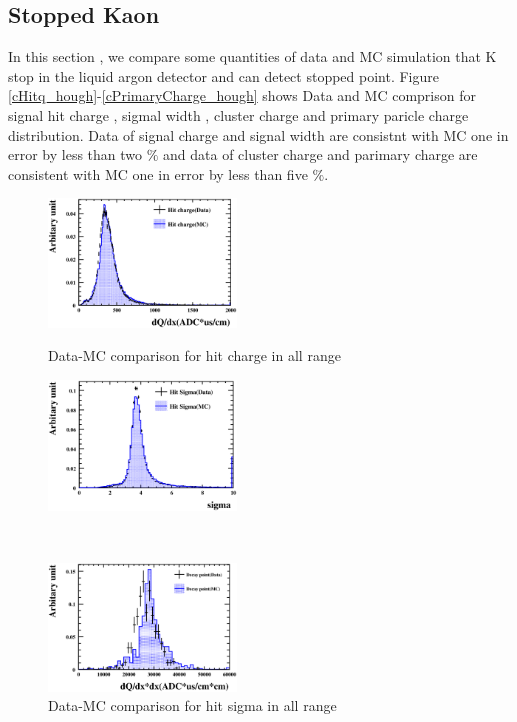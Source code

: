 \subsection{Stopped Kaon}
In this section , we compare some quantities of data and MC simulation that K stop in the liquid argon detector and can detect stopped point.
Figure \ref{cHitq_hough}-\ref{cPrimaryCharge_hough} shows Data and MC comprison for signal hit charge , sigmal width , cluster charge and primary paricle charge distribution.
Data of signal charge and signal width are consistnt with MC one in error by less than two $\%$ and data of cluster charge and parimary charge are consistent with  MC one in error by less than five $\%$.
\begin{figure}[htbp]
  \begin{minipage}{0.5\hsize}
    \begin{center}
      \includegraphics[width=50mm]{fig/cHitq_hough.eps}
    \end{center}
    \caption{Data-MC comparison for hit charge in all range}
    \label{cHitq_hough}
  \end{minipage}
  \begin{minipage}{0.5\hsize}
    \begin{center}
      \includegraphics[width=50mm]{fig/cHitSigma_hough.eps}
    \end{center}
    \caption{Data-MC comparison for hit sigma in all range}
    \label{cHitSigma_hough}
  \end{minipage}
\\
  \begin{minipage}{0.5\hsize}
    \begin{center}
      \includegraphics[width=50mm]{fig/cClusterCharge_hough.eps}

\end{center}
\end{minipage}
\end{figure}
